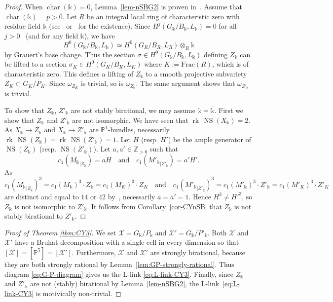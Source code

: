 \documentclass[a4paper,12pt]{amsart}
\def\k{\mathbb k}
\def\P{\mathbb P}
\def\bP{\mathbb P}
\def\Z{\mathbb Z}
\def\XX{\mathcal X}
\def\chr{{\operatorname{char}}}
\def\NS{{\operatorname{NS}}}
\def\rk{{\operatorname{rk}}}
\def\chr{{\operatorname{char}}}
\def\ol{\overline}
\theoremstyle{plain}
\numberwithin{equation}{section}
\theoremstyle{definition}
\newcommand{\go}{\omega}
\newcommand{\gs}{\sigma}
\newcommand{\Frac}{\mathrm{Frac}}
\newcommand{\cnec}{\mathrel{:=}}
\renewcommand{\(}{\left(}
\renewcommand{\)}{\right)}
\begin{document}
\begin{proof}
When $\chr(\k) = 0$, Lemma~\ref{lem-nSBG2} is proven in~\cite{IMOUG2}.
Assume that $\chr(\k) = p > 0$.
Let $R$ be an integral local ring of characteristic zero with residue field $\k$
(see~\cite[Satz 20]{HasseSchmidt} or~\cite[Theorem 2.10]{HSbis} for the existence).
Since $H^j(G_\k/B_\k,L_\k)=0$ for all $j > 0$~\cite[Theorem 2]{RamRam} (and for any field $\k$),
we have
$$H^0(G_\k/B_\k,L_\k) \simeq H^0(G_R/B_R,L_R) \otimes_R \k$$
by Grauert's base change.
Thus the section $\gs \in H^0(G_\k/B_\k,L_\k)$
defining $Z_\k$
can be lifted to a section $\gs_K \in H^0(G_K/B_K,L_K)$
where $K \cnec \Frac (R)$, which is of characteristic zero.
This defines a lifting of $Z_\k$ to a smooth projective subvariety 
$Z_K \subset G_K/P_K$.  
Since $\go_{Z_K}$ is trivial, so is $\go_{Z_\k}$.
The same argument shows that $\go_{Z'_\k}$
is trivial.

To show that $Z_\k$, $Z'_\k$ are not stably birational,
we may assume $\k = \ol{\k}$. First
we show that $Z_{\k}$ and $Z'_{\k}$
are not isomorphic.
We have seen that $\rk\,\NS(X_{\k}) = 2$.
As $X_{\k} \to Z_{\k}$ and $X_{\k} \to Z'_{\k}$ are $\bP^1$-bundles,
necessarily $\rk\,\NS(Z_{\k})= \rk\,\NS(Z'_{\k}) = 1$.
Let $H$ (resp. $H'$) 
be the ample generator of $\NS(Z_{\k})$ (resp. $\NS(Z'_{\k})$).
Let $a, a' \in \Z_{>0}$ such that
$$c_1({M_{\k}}_{|Z_{\k}}) = aH \ \ \ \text{ and } \ \ \
c_1({M'_{\k}}_{|Z'_{\k}}) = a'H'.$$
As 
$$c_1({M_{\k}}_{|Z_{\k}})^3 = c_1(M_{\k})^3 \cdot Z_{\k} 
= c_1(M_K)^3 \cdot Z_K
\ \ \
\text{ and }  \ \ \ c_1({M'_{\k}}_{|Z'_{\k}})^3 = c_1(M'_{\k})^3 \cdot Z'_{\k} = c_1(M'_K)^3 \cdot Z'_K$$
are distinct and equal to 
$14$ or $42$ by~\cite{IMOUG2},
necessarily $a = a' =1$.
Hence $H^3 \ne H'^3$,
so $Z_{\k}$ is not isomorphic to $Z'_{\k}$.
It follows from Corollary~\ref{cor-CYnSB}
that $Z_\k$ is not stably birational to $Z'_\k$.
\end{proof}





\begin{proof}[Proof of Theorem \ref{thm:CY3}]
We set $\XX = G_\k/P_\k$
and $\XX' = G_\k/P'_\k$.
Both $\XX$ and $\XX'$ have a 
Bruhat decomposition
with a single cell in every dimension so that
$[\XX] = [\P^5] = [\XX']$.
Furthermore, $\XX$ and $\XX'$ are strongly
birational, because they are both
strongly rational by Lemma~\ref{lem:GP-strongly-rational}.
Thus diagram \eqref{eq:G-P-diagram} gives us the L-link
\eqref{eq:L-link-CY3}.
Finally, since  
$Z_\k$ and $Z'_\k$ are not (stably) birational by Lemma~\ref{lem-nSBG2},
the L-link~\eqref{eq:L-link-CY3} is motivically non-trivial.
\end{proof}
\end{document}
